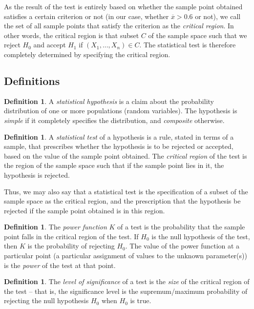 \documentclass[svgnames, a5paper]{article}
\theoremstyle{definition}
\newtheorem{Definition}[Theorem]{Definition}
\theoremstyle{remark}
\begin{document}
As the result of the test is entirely based on whether the sample point obtained satisfies a certain criterion or not (in our case, whether $\overline x > 0.6$ or not), we call the set of all sample points that satisfy the criterion as the \emph{critical region}. In other words, the critical region is that subset $C$ of the sample space such that we reject $H_0$ and accept $H_1$ if $(X_1, \ldots, X_n) \in C$. The statistical test is therefore completely determined by specifying the critical region.

\subsection{Definitions}\label{subsec:Definitions}
\begin{Definition}
A \emph{statistical hypothesis} is a claim about the probability distribution of one or more populations (random variables). The hypothesis is \emph{simple} if it completely specifies the distribution, and \emph{composite} otherwise.
\end{Definition}

\begin{Definition}
A \emph{statistical test} of a hypothesis is a rule, stated in terms of a sample, that prescribes whether the hypothesis is to be rejected or accepted, based on the value of the sample point obtained. The \emph{critical region} of the test is the region of the sample space such that if the sample point lies in it, the hypothesis is rejected.
\end{Definition}

Thus, we may also say that a statistical test is the specification of a subset of the sample space as the critical region, and the prescription that the hypothesis be rejected if the sample point obtained is in this region.

\begin{Definition}
The \emph{power function} $K$ of a test is the probability that the sample point falls in the critical region of the test. If $H_0$ is the null hypothesis of the test, then $K$ is the probability of rejecting $H_0$. The value of the power function at a particular point (a particular assignment of values to the unknown parameter(s)) is the \emph{power} of the test at that point.
\end{Definition}

\begin{Definition}
The \emph{level of significance} of a test is the \emph{size} of the critical region of the test -- that is, the significance level is the supremum/maximum probability of rejecting the null hypothesis $H_0$ when $H_0$ is true.
\end{Definition}
\end{document}
